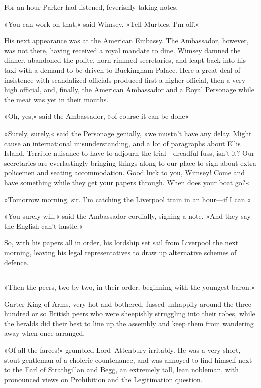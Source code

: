 For an hour Parker had listened, feverishly taking notes.

»You can work on that,« said Wimsey. »Tell Murbles. I'm off.«

His next appearance was at the American Embassy. The Ambassador, however, was not there, having received a royal mandate to dine. Wimsey damned the dinner, abandoned the polite, horn-rimmed secretaries, and leapt back into his taxi with a demand to be driven to Buckingham Palace. Here a great deal of insistence with scandalized officials produced first a higher official, then a very high official, and, finally, the American Ambassador and a Royal Personage while the meat was yet in their mouths.

»Oh, yes,« said the Ambassador, »of course it can be done\longdash«

»Surely, surely,« said the Personage genially, »we mustn't have any delay. Might cause an international misunderstanding, and a lot of paragraphs about Ellis Island. Terrible nuisance to have to adjourn the trial—dreadful fuss, isn't it? Our secretaries are everlastingly bringing things along to our place to sign about extra policemen and seating accommodation. Good luck to you, Wimsey! Come and have something while they get your papers through. When does your boat go?«

»Tomorrow morning, sir. I'm catching the Liverpool train in an hour—if I can.«

»You surely will,« said the Ambassador cordially, signing a note. »And they say the English can't hustle.«

So, with his papers all in order, his lordship set sail from Liverpool the next morning, leaving his legal representatives to draw up alternative schemes of defence. 

\noindent\hfil\rule{0.5\textwidth}{.4pt}\hfil 

»Then the peers, two by two, in their order, beginning with the youngest baron.«

Garter King-of-Arms, very hot and bothered, fussed unhappily around the three hundred or so British peers who were sheepishly struggling into their robes, while the heralds did their best to line up the assembly and keep them from wandering away when once arranged.

»Of all the farces!« grumbled Lord~Attenbury irritably. He was a very short, stout gentleman of a choleric countenance, and was annoyed to find himself next to the Earl of Strathgillan and Begg, an extremely tall, lean nobleman, with pronounced views on Prohibition and the Legitimation question.

